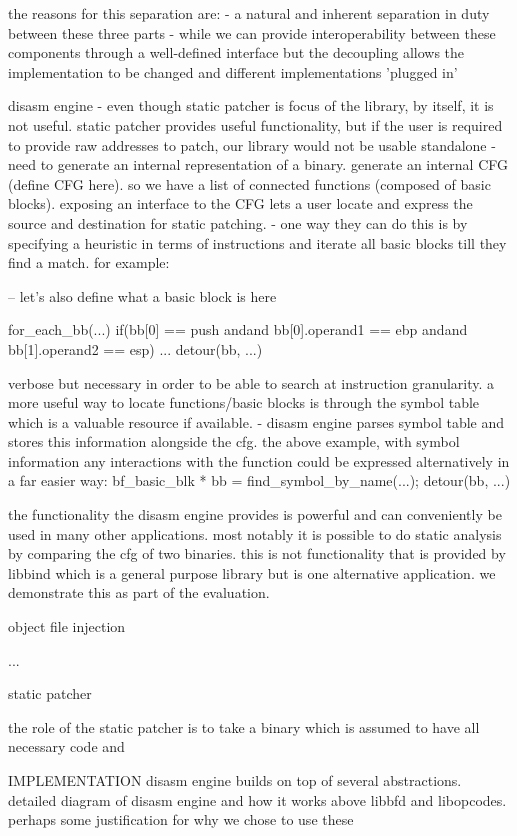 the reasons for this separation are:
- a natural and inherent separation in duty between these three parts
- while we can provide interoperability between these components through a well-defined interface but the decoupling allows the implementation to be changed and different implementations 'plugged in'

disasm engine
- even though static patcher is focus of the library, by itself, it is not useful. static patcher provides useful functionality, but if the user is required to provide raw addresses to patch, our library would not be usable standalone
- need to generate an internal representation of a binary. generate an internal CFG (define CFG here). so we have a list of connected functions (composed of basic blocks). exposing an interface to the CFG lets a user locate and express the source and destination for static patching.
- one way they can do this is by specifying a heuristic in terms of instructions and iterate all basic blocks till they find a match. for example:

-- let's also define what a basic block is here

  for\_each\_bb(...) {
    if(bb[0] == push andand bb[0].operand1 == ebp andand bb[1].operand2 == esp)
    ... {
      detour(bb, ...)
    }
  }

verbose but necessary in order to be able to search at instruction granularity. a more useful way to locate functions/basic blocks is through the symbol table which is a valuable resource if available.
- disasm engine parses symbol table and stores this information alongside the cfg. the above example, with symbol information any interactions with the function could be expressed alternatively in a far easier way:
  bf\_basic\_blk * bb = find\_symbol\_by\_name(...);
  detour(bb, ...)

the functionality the disasm engine provides is powerful and can conveniently be used in many other applications. most notably it is possible to do static analysis by comparing the cfg of two binaries. this is not functionality that is provided by libbind which is a general purpose library but is one alternative application. we demonstrate this as part of the evaluation.

object file injection

...

static patcher

the role of the static patcher is to take a binary which is assumed to have all necessary code and 

IMPLEMENTATION
disasm engine builds on top of several abstractions. detailed diagram of disasm engine and how it works above libbfd and libopcodes. perhaps some justification for why we chose to use these

